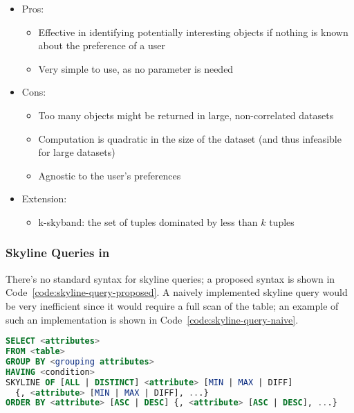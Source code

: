 \documentclass[english]{article}
\begin{document}
\begin{itemize}
  \item Pros:
        \begin{itemize}[label=\cmarkthin]
          \item Effective in identifying potentially interesting objects if nothing is known about the preference of a user
          \item Very simple to use, as no parameter is needed
        \end{itemize}
  \item Cons:
        \begin{itemize}[label=\xmarkthin]
          \item Too many objects might be returned in large, non-correlated datasets
          \item Computation is quadratic in the size of the dataset (and thus infeasible for large datasets)
          \item Agnostic to the user's preferences
        \end{itemize}
  \item Extension:
        \begin{itemize}
          \item k-skyband: the set of tuples dominated by less than \(k\) tuples
        \end{itemize}
\end{itemize}

\subsubsection{Skyline Queries in \sql}

There's no standard \sql syntax for skyline queries;
a proposed syntax is shown in Code~\ref{code:skyline-query-proposed}.
A naively implemented skyline query would be very inefficient since it would require a full scan of the table;
an example of such an implementation is shown in Code~\ref{code:skyline-query-naive}.

\begin{lstlisting}[language=sql, morekeywords={SKYLINE}, caption={Proposed syntax for skyline queries}, label=code:skyline-query-proposed]
SELECT <attributes>
FROM <table>
GROUP BY <grouping attributes>
HAVING <condition>
SKYLINE OF [ALL | DISTINCT] <attribute> [MIN | MAX | DIFF]
  {, <attribute> [MIN | MAX | DIFF], ...}
ORDER BY <attribute> [ASC | DESC] {, <attribute> [ASC | DESC], ...}
\end{lstlisting}
\end{document}
